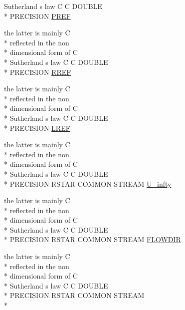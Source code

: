 \begin{DoxyCompactItemize}
Sutherland s law C C D\-O\-U\-B\-L\-E \\*
P\-R\-E\-C\-I\-S\-I\-O\-N \hyperlink{home_2abonfi_2_c_f_d__codes_2_eul_f_s_83_84_2include_2stream_8com_ac527abdf107d6bddcbc6a80631e1ab59}{P\-R\-E\-F}
\item 
the latter is mainly C \\*
reflected in the non \\*
dimensional form of C \\*
Sutherland s law C C D\-O\-U\-B\-L\-E \\*
P\-R\-E\-C\-I\-S\-I\-O\-N \hyperlink{home_2abonfi_2_c_f_d__codes_2_eul_f_s_83_84_2include_2stream_8com_a79112f231fb3da56eef3fc61c1e77bbd}{R\-R\-E\-F}
\item 
the latter is mainly C \\*
reflected in the non \\*
dimensional form of C \\*
Sutherland s law C C D\-O\-U\-B\-L\-E \\*
P\-R\-E\-C\-I\-S\-I\-O\-N \hyperlink{home_2abonfi_2_c_f_d__codes_2_eul_f_s_83_84_2include_2stream_8com_a19d492a15feda819ed49e580c6a1568f}{L\-R\-E\-F}
\item 
the latter is mainly C \\*
reflected in the non \\*
dimensional form of C \\*
Sutherland s law C C D\-O\-U\-B\-L\-E \\*
P\-R\-E\-C\-I\-S\-I\-O\-N R\-S\-T\-A\-R C\-O\-M\-M\-O\-N S\-T\-R\-E\-A\-M \hyperlink{home_2abonfi_2_c_f_d__codes_2_eul_f_s_83_84_2include_2stream_8com_a396c12357ce60c0aaccd169e136b5d9a}{U\-\_\-infty}
\item 
the latter is mainly C \\*
reflected in the non \\*
dimensional form of C \\*
Sutherland s law C C D\-O\-U\-B\-L\-E \\*
P\-R\-E\-C\-I\-S\-I\-O\-N R\-S\-T\-A\-R C\-O\-M\-M\-O\-N S\-T\-R\-E\-A\-M \hyperlink{home_2abonfi_2_c_f_d__codes_2_eul_f_s_83_84_2include_2stream_8com_af5929b7a58c2e64c3b9908fd35bc0e5a}{F\-L\-O\-W\-D\-I\-R}
\item 
the latter is mainly C \\*
reflected in the non \\*
dimensional form of C \\*
Sutherland s law C C D\-O\-U\-B\-L\-E \\*
P\-R\-E\-C\-I\-S\-I\-O\-N R\-S\-T\-A\-R C\-O\-M\-M\-O\-N S\-T\-R\-E\-A\-M \\*

\end{DoxyCompactItemize}

